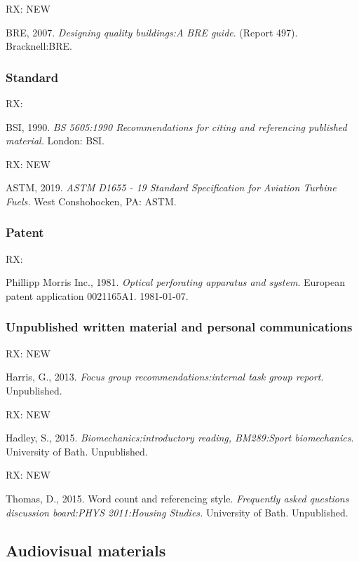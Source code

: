 RX: \cite{bre2007dqb} NEW

BRE, 2007. \emph{Designing quality buildings:\@ A BRE guide}. (Report 497). Bracknell:\@ BRE.



\subsubsection*{Standard}

RX: \cite{bs5605:1990}

BSI, 1990. \emph{BS 5605:1990 Recommendations for citing and referencing
published material.} London: BSI.


RX: \cite{astm.d1655} NEW

ASTM, 2019. \emph{ASTM D1655 - 19 Standard Specification for Aviation
Turbine Fuels.} West Conshohocken, PA: ASTM.



\subsubsection*{Patent}

RX: \cite{pm1981opa}

Phillipp Morris Inc., 1981. \emph{Optical perforating apparatus and system}. European patent application 0021165A1. 1981-01-07.



\subsubsection*{Unpublished written material and personal communications}

RX: \cite{harris2013fgr} NEW

Harris, G., 2013. \emph{Focus group recommendations:\@ internal task group
report}. Unpublished.


RX: \cite{hadley2015bir} NEW

Hadley, S., 2015. \emph{Biomechanics:\@ introductory reading, BM289:\@ Sport
biomechanics}. University of Bath. Unpublished.


RX: \cite{thomas2015wcr} NEW

Thomas, D., 2015. Word count and referencing style. \emph{Frequently
asked questions discussion board:\@ PHYS 2011:\@ Housing Studies.}
University of Bath. Unpublished.



\subsection{Audiovisual materials}

